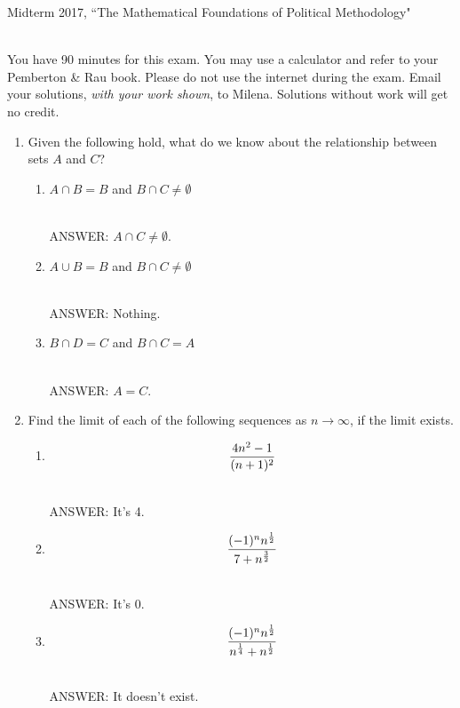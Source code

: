 \documentclass[11pt]{article}
\begin{document}
\noindent \large Midterm 2017, ``The Mathematical Foundations of Political Methodology"

\normalsize
\ \\You have 90 minutes for this exam.  You may use a calculator and refer to your Pemberton \& Rau book.  Please do not use the internet during the exam.  Email your solutions, \textit{with your work shown}, to Milena.  Solutions without work will get no credit.

\begin{enumerate}

\item Given the following hold, what do we know about the relationship between sets $A$ and $C$?

\begin{enumerate}
\item $A\cap B= B$ and $B\cap C\not=\emptyset$


\ \\ANSWER:  $A\cap C\not=\emptyset$.

\item $A\cup B= B$ and $B\cap C\not=\emptyset$


\ \\ANSWER:  Nothing.

\item $B \cap D=C$ and $B\cap C=A$

\ \\ANSWER:   $A = C$.

\end{enumerate}

\vspace{.2in}

\item Find the limit of each of the following sequences as $n\rightarrow \infty$, if the limit exists.
\begin{enumerate}
\item $${{4n^2-1}\over{(n+1)^2}}$$

\ \\ANSWER:  It's 4.

\item $${{(-1)^n n^{1\over 2}}\over{7+n^{3\over 2}}}$$


\ \\ANSWER:   It's 0.

\item $${{(-1)^n n^{1\over 2}}\over{n^{1\over 4}+n^{1\over 2}}}$$

\ \\ANSWER:   It doesn't exist.
\end{enumerate}


\end{enumerate}
\end{document}
